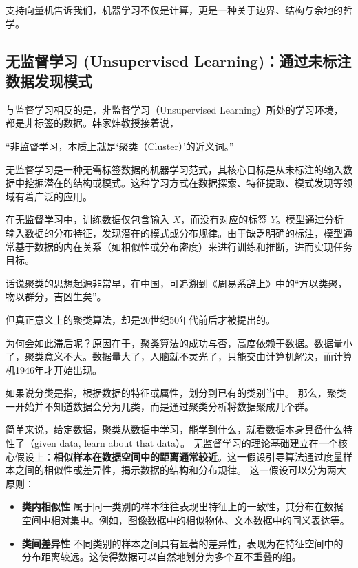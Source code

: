 {支持向量机告诉我们，机器学习不仅是计算，更是一种关于边界、结构与余地的哲学。





\subsection{ 无监督学习 (Unsupervised Learning)：通过未标注数据发现模式}

与监督学习相反的是，非监督学习（Unsupervised Learning）所处的学习环境，都是非标签的数据。韩家炜教授接着说\cite{han2011data}，

“非监督学习，本质上就是‘聚类（Cluster）’的近义词。”

无监督学习是一种无需标签数据的机器学习范式，其核心目标是从未标注的输入数据中挖掘潜在的结构或模式。这种学习方式在数据探索、特征提取、模式发现等领域有着广泛的应用。

在无监督学习中，训练数据仅包含输入 $X$，而没有对应的标签 $Y$。模型通过分析输入数据的分布特征，发现潜在的模式或分布规律。由于缺乏明确的标注，模型通常基于数据的内在关系（如相似性或分布密度）来进行训练和推断，进而实现任务目标。

话说聚类的思想起源非常早，在中国，可追溯到《周易\textperiodcentered 系辞上》中的“方以类聚，物以群分，吉凶生矣”。

但真正意义上的聚类算法，却是20世纪50年代前后才被提出的。

为何会如此滞后呢？原因在于，聚类算法的成功与否，高度依赖于数据。数据量小了，聚类意义不大。数据量大了，人脑就不灵光了，只能交由计算机解决，而计算机1946年才开始出现。

如果说分类是指，根据数据的特征或属性，划分到已有的类别当中。
那么，聚类一开始并不知道数据会分为几类，而是通过聚类分析将数据聚成几个群。

简单来说，给定数据，聚类从数据中学习，能学到什么，就看数据本身具备什么特性了（given data, learn about that data）。
无监督学习的理论基础建立在一个核心假设上：{\bf 相似样本在数据空间中的距离通常较近}。这一假设引导算法通过度量样本之间的相似性或差异性，揭示数据的结构和分布规律。
这一假设可以分为两大原则：
\begin{itemize}
\item {\bf 类内相似性}  属于同一类别的样本往往表现出特征上的一致性，其分布在数据空间中相对集中。例如，图像数据中的相似物体、文本数据中的同义表达等。
\item {\bf 类间差异性}  不同类别的样本之间具有显著的差异性，表现为在特征空间中的分布距离较远。这使得数据可以自然地划分为多个互不重叠的组。
\end{itemize}

}
